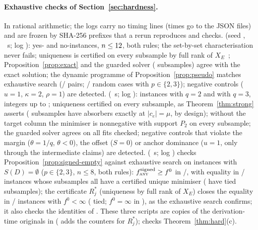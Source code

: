 \documentclass[10pt,a4paper]{article}
\theoremstyle{plain}
\theoremstyle{definition}
\theoremstyle{remark}
\newcommand{\tsc}[1]{\textnormal{\textsc{#1}}}  %
\begin{document}
\paragraph{Exhaustive checks of Section~\ref{sec:hardness}.} {\sloppy In rational arithmetic; the logs carry no timing lines (times go to the JSON files) and are frozen by SHA-256 prefixes that a rerun reproduces and  checks.  (seed \HardSeed, \HardSeconds~s; log \texttt{\HardSha}): \HardYes{} yes- and \HardNo{} no-instances, $n\le12$, both rules; the set-by-set characterisation never fails; uniqueness is certified on every subsample by full rank of $X_E$~\citep{tibshirani2013}; Proposition~\ref{prop:exact} and the guarded solver (\HardSolverChecked{} subsamples) agree with the exact solution; the dynamic programme of Proposition~\ref{prop:pseudo} matches exhaustive search (\HardDPAgree/\HardPairs{} pairs; \HardDPRandAgree/\HardDPRandTotal{} random cases with $p\in\{2,3\}$); negative controls ($u=1$, $\kappa=2$, $\rho=1$) are detected.  (\StrongSeconds~s; log \texttt{\StrongSha}): \StrongNqTwo{} instances with $q=2$ and \StrongNqThree{} with $q=3$, integers up to \StrongMaxInt{}; uniqueness certified on every subsample, as Theorem~\ref{thm:strong} asserts (\StrongTies{} subsamples have absorbers exactly at $|c_e|=\mu$, by design); without the target column the minimiser is nonnegative with support $P_2$ on every subsample; the guarded solver agrees on all \StrongLibChecked{} fits checked; negative controls that violate the margin ($\theta=1/q$, $\theta<0$), the offset ($S=0$) or anchor dominance ($u=1$, only through the intermediate claims) are detected.  (\SignedSeconds~s; log \texttt{\SignedSha}) checks Proposition~\ref{prop:signed-empty} against exhaustive search on \SignedEmptyTotal{} instances with $S(D)=\emptyset$ ($p\in\{2,3\}$, $n\le8$, both rules): $f^{\mathrm{signed}}_{\tsc{any}}\ge f^0$ in \SignedEmptyGe/\SignedEmptyTotal, with equality in \SignedEmptyAgree/\SignedEmptyClean{} instances whose subsamples all have a certified unique minimiser (\SignedEmptyTies{} have tied subsamples); the certificate $R^\ast_j$ (uniqueness by full rank of $X_E$) closes the equality in \SignedCertOk/\SignedEmptyFinite{} instances with $f^0<\infty$ (\SignedCertTies{} tied; $f^0=\infty$ in \SignedEmptyInf), as the exhaustive search confirms; it also checks the identities of . These three scripts are copies of the derivation-time originals in  ( adds the counters for $R^\ast_j$);  checks Theorem~\ref{thm:hard}(c).\par}
\end{document}
